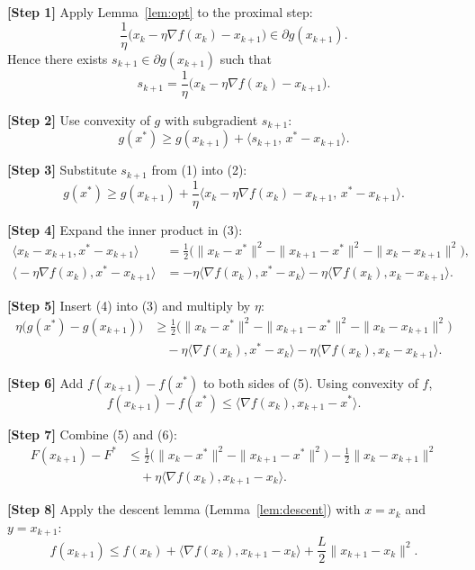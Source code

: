 \documentclass[11pt]{article}
\begin{document}
\noindent\textbf{[Step 1]} Apply Lemma~\ref{lem:opt} to the proximal step:
\[
\frac{1}{\eta}\big(x_{k}-\eta\nabla f(x_{k})-x_{k+1}\big)\in\partial g(x_{k+1}).
\]
Hence there exists $s_{k+1}\in\partial g(x_{k+1})$ such that
\[
s_{k+1}= \frac{1}{\eta}\big(x_{k}-\eta\nabla f(x_{k})-x_{k+1}\big).
\tag{1}
\]

\noindent\textbf{[Step 2]} Use convexity of $g$ with subgradient $s_{k+1}$:
\[
g(x^{*})\ge g(x_{k+1})+\langle s_{k+1},\,x^{*}-x_{k+1}\rangle .
\tag{2}
\]

\noindent\textbf{[Step 3]} Substitute $s_{k+1}$ from (1) into (2):
\[
g(x^{*})\ge g(x_{k+1})+\frac{1}{\eta}\big\langle x_{k}-\eta\nabla f(x_{k})-x_{k+1},\,x^{*}-x_{k+1}\big\rangle .
\tag{3}
\]

\noindent\textbf{[Step 4]} Expand the inner product in (3):
\[
\begin{aligned}
\big\langle x_{k}-x_{k+1},x^{*}-x_{k+1}\big\rangle
&= \frac12\Big(\|x_{k}-x^{*}\|^{2}-\|x_{k+1}-x^{*}\|^{2}-\|x_{k}-x_{k+1}\|^{2}\Big),\\
\big\langle -\eta\nabla f(x_{k}),x^{*}-x_{k+1}\big\rangle
&= -\eta\langle\nabla f(x_{k}),x^{*}-x_{k}\rangle
   -\eta\langle\nabla f(x_{k}),x_{k}-x_{k+1}\rangle .
\end{aligned}
\tag{4}
\]

\noindent\textbf{[Step 5]} Insert (4) into (3) and multiply by $\eta$:
\[
\begin{aligned}
\eta\big(g(x^{*})-g(x_{k+1})\big)
&\ge \frac12\big(\|x_{k}-x^{*}\|^{2}-\|x_{k+1}-x^{*}\|^{2}-\|x_{k}-x_{k+1}\|^{2}\big)\\
&\quad -\eta\langle\nabla f(x_{k}),x^{*}-x_{k}\rangle-\eta\langle\nabla f(x_{k}),x_{k}-x_{k+1}\rangle .
\end{aligned}
\tag{5}
\]

\noindent\textbf{[Step 6]} Add $f(x_{k+1})-f(x^{*})$ to both sides of (5). Using convexity of $f$,
\[
f(x_{k+1})-f(x^{*})\le \langle\nabla f(x_{k}),x_{k+1}-x^{*}\rangle .
\tag{6}
\]

\noindent\textbf{[Step 7]} Combine (5) and (6):
\[
\begin{aligned}
F(x_{k+1})-F^{*}
&\le \frac12\big(\|x_{k}-x^{*}\|^{2}-\|x_{k+1}-x^{*}\|^{2}\big)
   -\frac12\|x_{k}-x_{k+1}\|^{2}\\
&\quad +\eta\langle\nabla f(x_{k}),x_{k+1}-x_{k}\rangle .
\end{aligned}
\tag{7}
\]

\noindent\textbf{[Step 8]} Apply the descent lemma (Lemma~\ref{lem:descent}) with $x=x_{k}$ and $y=x_{k+1}$:
\[
f(x_{k+1})\le f(x_{k})+\langle\nabla f(x_{k}),x_{k+1}-x_{k}\rangle
          +\frac{L}{2}\|x_{k+1}-x_{k}\|^{2}.
\tag{8}
\]
\end{document}
